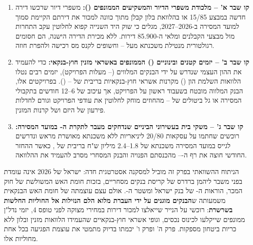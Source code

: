 \begin{enumerate}[label=\textbf{\arabic*.},rightmargin=0.6cm]
  \item \textbf{קו שבר א' – מלכודת משפרי הדיור והמשקיעים הממונפים ():} משפרי דיור שרכשו דירה חדשה במבצע \num{15/85} או בהלוואת בלון קבלן מתוך כוונה למכור את דירתם הקיימת סמוך למועד המסירה ב-\num{2026}--\num{2027}, מגלים כי שוק היד השנייה קפוא לחלוטין עקב התחרות מול מבצעי הקבלנים ומלאי ה-\num{85,900} דירות. ללא מכירת הדירה הישנה, הם חסומים רגולטורית מנטילת משכנתא מעל -- וחשופים לקנס מס רכישה ולהפרת חוזה.
  \item \textbf{קו שבר ב' – יזמים קטנים ובינוניים () הממונפים באשראי מזנין חוץ-בנקאי:} כדי להעמיד את ההון העצמי שנדרש על ידי הבנקים המלווים (-- מעלות הפרויקט), יזמים רבים נטלו הלוואות השלמת הון () מקרנות אשראי חוץ-בנקאיות בריבית של -- (). בפרויקטים אלו, הבנק המלווה מובטח בשעבוד ראשון על הפרויקט, אך עיכוב של \num{6}--\num{12} חודשים בתקבולי המסירה או גל ביטולים של -- מהחוזים מוחק לחלוטין את עודפי הפרויקט וגורם לחדלות פירעון של היזם ושל קרנות המזנין.
  \item \textbf{קו שבר ג' – משקי בית בעשירוני הביניים שנדחקים מעבר לתקרת ה- במועד המסירה:} רוכשים שחתמו על עסקאות \num{20/80} ליניאריות ללא משכנתא מאושרת מראש ונדרשים לגייס במועד המסירה משכנתא של \num{1.8}--\num{2.4} מיליון ש"ח בריבית של , כאשר ההחזר החודשי חוצה את רף ה--- מהכנסתם הפנויה והבנק המסחרי מסרב להעמיד את ההלוואה.
\end{enumerate}

\begin{managerbox}
הניתוח ההשוואתי בפרק זה מוביל למסקנה אסטרטגית חדה: ישראל של \num{2026} אינה עומדת בפני משבר ליהמן ברדרס של קריסת בנקים מסחריים, בזכות חומת האש המשולשת של חוק המכר, הוראות ה- של בנק ישראל ומשטר ה-. אולם עצם עוצמתה של חומת האש הבנקאית משמעותה ש\textbf{הבנקים מוגנים על ידי העברת מלוא הלם הנזילות אל החוליות החלשות בשרשרת}: רוכשי על הנייר שייאלצו למכור דירות במחירי מצוקה לפני טופס \num{4}, יזמי נדל"ן ממונפים שייקלעו לכינוס נכסים, וגופי אשראי חוץ-בנקאיים שהעמידו הלוואות מזנין ובלון ללא כריות ביטחון מספקות. פרק ה' ופרק ו' יכמתו בדיוק מתמטי את עוצמת הפגיעה בכל אחת מחוליות אלו.
\end{managerbox}
